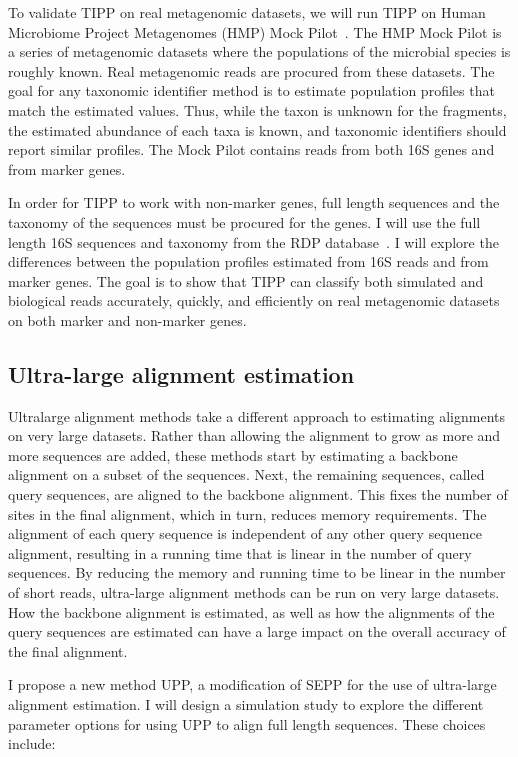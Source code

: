 \documentclass[times, 10pt]{article}
\begin{document}
To validate TIPP on real metagenomic datasets, we will run TIPP on Human Microbiome Project Metagenomes (HMP) Mock Pilot~\cite{mockcommunity}.  The HMP Mock Pilot is a series of metagenomic datasets where the populations of the microbial species is roughly known.  Real metagenomic reads are procured from these datasets.  The goal for any taxonomic identifier method is to estimate population profiles that match the estimated values.  Thus, while the taxon is unknown for the fragments, the estimated abundance of each taxa is known, and taxonomic identifiers should report similar profiles.  The Mock Pilot contains reads from both 16S genes and from marker genes.  

In order for TIPP to work with non-marker genes, full length sequences and the taxonomy of the sequences must be procured for the genes.  I will use the full length 16S sequences and taxonomy from the RDP database~\cite{Cole2009}.  I will explore the differences between the population profiles estimated from 16S reads and from marker genes.  The goal is to show that TIPP can classify both simulated and biological reads accurately, quickly, and efficiently on real metagenomic datasets on both marker and non-marker genes.

\subsection{Ultra-large alignment estimation}
Ultralarge alignment methods take a different approach to estimating alignments on very large datasets.  Rather than allowing the alignment to grow as more and more sequences are added, these methods start by estimating a backbone alignment on a subset of the sequences.  Next, the remaining sequences, called query sequences, are aligned to the backbone alignment.  This fixes the number of sites in the final alignment, which in turn, reduces memory requirements.  The alignment of each query sequence is independent of any other query sequence alignment, resulting in a running time that is linear in the number of query sequences.  By reducing the memory and running time to be linear in the number of short reads, ultra-large alignment methods can be run on very large datasets.  How the backbone alignment is estimated, as well as how the alignments of the query sequences are estimated can have a large impact on the overall accuracy of the final alignment.  

I propose a new method UPP, a modification of SEPP for the use of ultra-large alignment estimation.  I will design a simulation study to explore the different parameter options for using UPP to align full length sequences.  These choices include:
\end{document}
